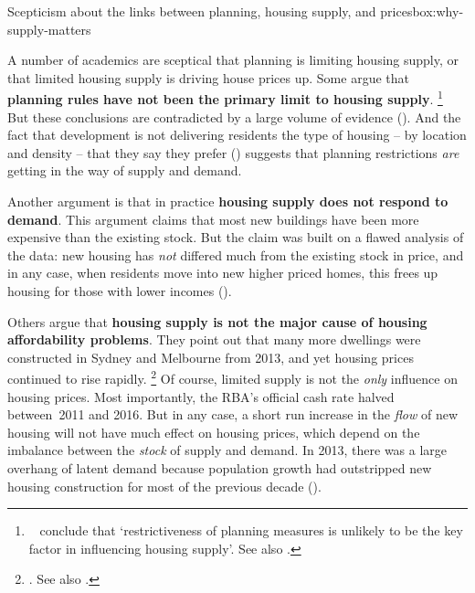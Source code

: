 \begin{bigbox}{Scepticism about the links between planning, housing supply, and prices}{box:why-supply-matters}

A number of academics are sceptical that planning is limiting housing supply, or that limited housing supply is driving house prices up. Some argue that \textbf{planning rules have not been the primary limit to housing supply}.%
    \footnote{\eg~\textcite{OngEtAl-AHURI-2017-Housing-supply-responsiveness} conclude that `restrictiveness of planning measures is unlikely to be the key factor in influencing housing supply'. See also \textcite{Gurran_Phibbs_2016_boulevard}.}
But these conclusions are contradicted by a large volume of evidence (). 
And the fact that development is not delivering residents the type of housing -- by location and density -- that they say they prefer () suggests that planning restrictions \textit{are} getting in the way of supply and demand. 

Another argument is that in practice \textbf{housing supply does not respond to demand}. This argument claims that most new buildings have been more expensive than the existing stock.
But the claim was built on a flawed analysis of the data: new housing has \emph{not} differed much from the existing stock in price, and in any case, when residents move into new higher priced homes, this frees up housing for those with lower incomes ().    
 
Others argue that \textbf{housing supply is not the major cause of housing affordability problems}.
They point out that many more dwellings were constructed in Sydney and Melbourne from 2013, and yet housing prices continued to rise rapidly.%
    \footnote{\textcite{RowleyGurranPhibbs-2017-worldleaderhomebuilding}. See also \textcite{Pawson-2017-theConvo-To-do-list-for-NSW-Premier}.}
Of course, limited supply is not the \textit{only} influence on housing prices.
Most importantly, the RBA's official cash rate halved between~2011 and 2016.
But in any case, a short run increase in the \textit{flow} of new housing will not have much effect on housing prices, which depend on the imbalance between the \textit{stock} of supply and demand.
In 2013, there was a large overhang of latent demand because population growth had outstripped new housing construction for most of the previous decade ().


\end{bigbox}
